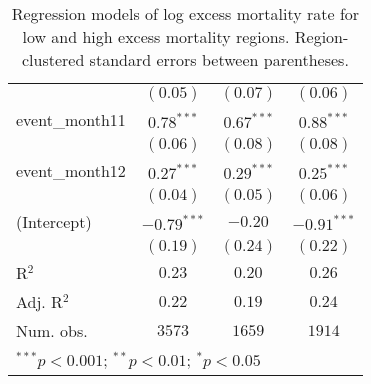 \begin{table}
\begin{center}
\begin{tabular}{l c c c}
               & $(0.05)$      & $(0.07)$      & $(0.06)$      \\
event\_month11 & $0.78^{***}$  & $0.67^{***}$  & $0.88^{***}$  \\
               & $(0.06)$      & $(0.08)$      & $(0.08)$      \\
event\_month12 & $0.27^{***}$  & $0.29^{***}$  & $0.25^{***}$  \\
               & $(0.04)$      & $(0.05)$      & $(0.06)$      \\
(Intercept)    & $-0.79^{***}$ & $-0.20$       & $-0.91^{***}$ \\
               & $(0.19)$      & $(0.24)$      & $(0.22)$      \\
\hline
R$^2$          & $0.23$        & $0.20$        & $0.26$        \\
Adj. R$^2$     & $0.22$        & $0.19$        & $0.24$        \\
Num. obs.      & $3573$        & $1659$        & $1914$        \\
\hline
\multicolumn{4}{l}{\scriptsize{$^{***}p<0.001$; $^{**}p<0.01$; $^{*}p<0.05$}}
\end{tabular}
\caption{Regression models of log excess mortality rate for low and high excess mortality regions. Region-clustered standard errors between parentheses.}
\label{tab:hilomodels}
\end{center}
\end{table}
